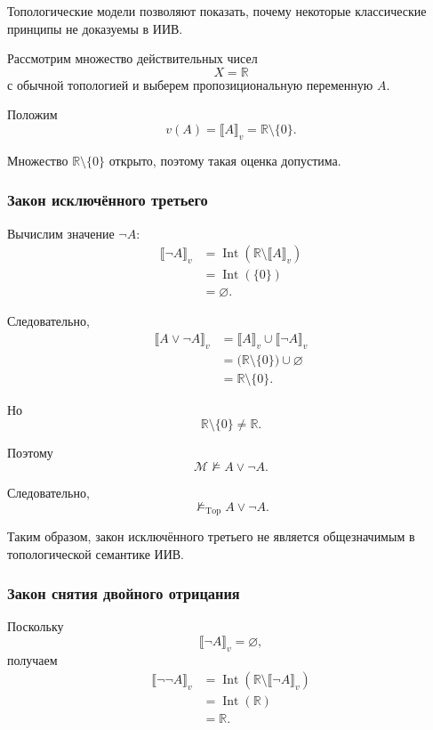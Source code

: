 \documentclass[12pt,a4paper,oneside,openany]{book}
\theoremstyle{definition}
\theoremstyle{plain}
\theoremstyle{remark}
\begin{document}
Топологические модели позволяют показать, почему некоторые
классические принципы не доказуемы в ИИВ.

Рассмотрим множество действительных чисел
\[
X=\mathbb R
\]
с обычной топологией и выберем пропозициональную переменную \(A\).

Положим
\[
v(A)
=
\llbracket A\rrbracket_v
=
\mathbb R\setminus\{0\}.
\]

Множество \(\mathbb R\setminus\{0\}\) открыто, поэтому такая оценка
допустима.

\subsubsection{Закон исключённого третьего}

Вычислим значение \(\neg A\):
\[
\begin{aligned}
\llbracket\neg A\rrbracket_v
&=
\operatorname{Int}
\left(
\mathbb R\setminus
\llbracket A\rrbracket_v
\right)
\\
&=
\operatorname{Int}(\{0\})
\\
&=
\varnothing.
\end{aligned}
\]

Следовательно,
\[
\begin{aligned}
\llbracket A\lor\neg A\rrbracket_v
&=
\llbracket A\rrbracket_v
\cup
\llbracket\neg A\rrbracket_v
\\
&=
\bigl(\mathbb R\setminus\{0\}\bigr)
\cup
\varnothing
\\
&=
\mathbb R\setminus\{0\}.
\end{aligned}
\]

Но
\[
\mathbb R\setminus\{0\}\neq\mathbb R.
\]

Поэтому
\[
\mathcal M\not\models A\lor\neg A.
\]

Следовательно,
\[
\not\models_{\mathrm{Top}}A\lor\neg A.
\]

Таким образом, закон исключённого третьего не является общезначимым
в топологической семантике ИИВ.

\subsubsection{Закон снятия двойного отрицания}

Поскольку
\[
\llbracket\neg A\rrbracket_v=\varnothing,
\]
получаем
\[
\begin{aligned}
\llbracket\neg\neg A\rrbracket_v
&=
\operatorname{Int}
\left(
\mathbb R\setminus
\llbracket\neg A\rrbracket_v
\right)
\\
&=
\operatorname{Int}(\mathbb R)
\\
&=
\mathbb R.
\end{aligned}
\]
\end{document}
